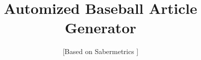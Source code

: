 \documentclass{sig-alternate}
\begin{document}
%

\title{Automized Baseball Article Generator}
\subtitle{[Based on Sabermetrics ]}
%
%
%
%
%
\end{document}
